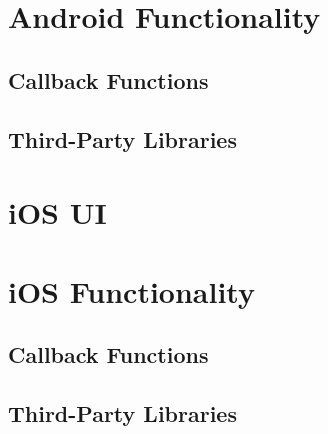 \section{Android Functionality}

\subsection{Callback Functions}\label{callback:and}

\subsection{Third-Party Libraries}



\section{iOS UI}


\section{iOS Functionality}

\subsection{Callback Functions}\label{callback:ios}

\subsection{Third-Party Libraries}